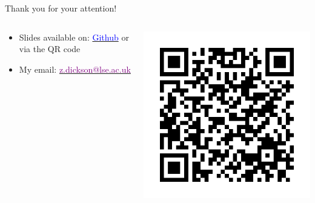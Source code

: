 \documentclass[10pt,aspectratio=169]{beamer}
\begin{document}
\begin{frame}{Thank you for your attention!}

\bigskip 

\begin{columns}[onlytextwidth]
    \begin{column}{0.6\textwidth}

\begin{itemize}
    \item Slides available on: \href{https://github.com/z-dickson/POAL-ML-and-public-opinion}{\textcolor{blue}{Github}} or via the QR code
    \item My email: \href{mailto:z.dickson@lse.ac.uk}{\textcolor{purple}{z.dickson@lse.ac.uk}}
\end{itemize}

\end{column}
\begin{column}{0.4\textwidth}

\includegraphics[width=.8\textwidth]{figures/qr_code.png}

\end{column}
\end{columns}
\end{frame}
\end{document}
